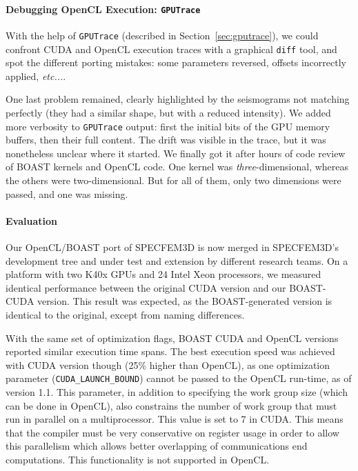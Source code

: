 \documentclass{IEEEtran}
\newcommand{\latin}[1]{\textit{#1}}
\newcommand{\etc}[1]{\latin{etc...}}
\newcommand{\code}[1]{\texttt{#1}}
\begin{document}
\paragraph{Debugging OpenCL Execution: \code{GPUTrace}} 
With the help of \code{GPUTrace} (described in Section~\ref{sec:gputrace}), we
could confront CUDA and OpenCL execution traces with a graphical \code{diff}
tool, and spot the different porting mistakes: some parameters reversed,
offsets incorrectly applied, \etc{}. 

One last problem remained, clearly highlighted by the seismograms not
matching perfectly (they had a similar shape, but with a reduced
intensity). We added more verbosity to \code{GPUTrace} output: first
the initial bits of the GPU memory buffers, then their full
content. The drift was visible in the trace, but it was nonetheless
unclear where it started. We finally got it after hours of code review
of BOAST kernels and OpenCL code. One kernel was
\emph{three}-dimensional, whereas the others were two-dimensional. But
for all of them, only two dimensions were passed, and one was
missing.

\paragraph{Evaluation} Our OpenCL/BOAST port of SPECFEM3D is now
merged in SPECFEM3D's development tree and under test and extension by
different research teams. On a platform with two K40x GPUs and 24 Intel
Xeon processors, we measured identical performance between the original
CUDA version and our BOAST-CUDA version. This result was expected, as
the BOAST-generated version is identical to the original, except from
naming differences.

With the same set of optimization flags, BOAST CUDA and OpenCL
versions reported similar execution time spans. The best execution
speed was achieved with CUDA version though (25\% higher than OpenCL),
as one optimization parameter (\code{CUDA\_LAUNCH\_BOUND}) cannot be
passed to the OpenCL run-time, as of version 1.1. This parameter, in
addition to specifying the work group size (which can be done in
OpenCL), also constrains the number of work group that must run in
parallel on a multiprocessor. This value is set to 7 in CUDA. This
means that the compiler must be very conservative on register usage in
order to allow this parallelism which allows better overlapping of
communications end computations.  This functionality is not supported
in OpenCL.
\end{document}
